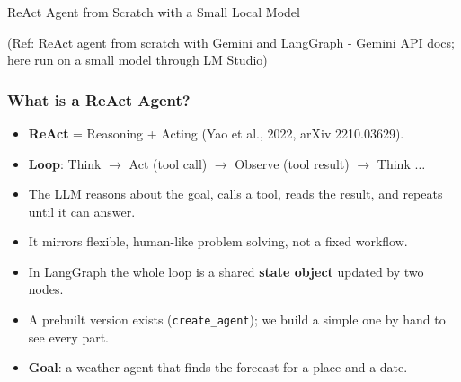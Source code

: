 \begin{frame}[fragile]\frametitle{}
\begin{center}
{\Large ReAct Agent from Scratch with a Small Local Model}

{\tiny (Ref: ReAct agent from scratch with Gemini and LangGraph - Gemini API docs; here run on a small model through LM Studio)}
\end{center}
\end{frame}

\begin{frame}[fragile]\frametitle{What is a ReAct Agent?}
      \begin{itemize}
        \item \textbf{ReAct} = Reasoning + Acting (Yao et al., 2022, arXiv 2210.03629).
        \item \textbf{Loop}: Think \(\rightarrow\) Act (tool call) \(\rightarrow\) Observe (tool result) \(\rightarrow\) Think \(\dots\)
        \item The LLM reasons about the goal, calls a tool, reads the result, and repeats until it can answer.
        \item It mirrors flexible, human-like problem solving, not a fixed workflow.
        \item In LangGraph the whole loop is a shared \textbf{state object} updated by two nodes.
        \item A prebuilt version exists (\texttt{create\_agent}); we build a simple one by hand to see every part.
        \item \textbf{Goal}: a weather agent that finds the forecast for a place and a date.
      \end{itemize}
\end{frame}

